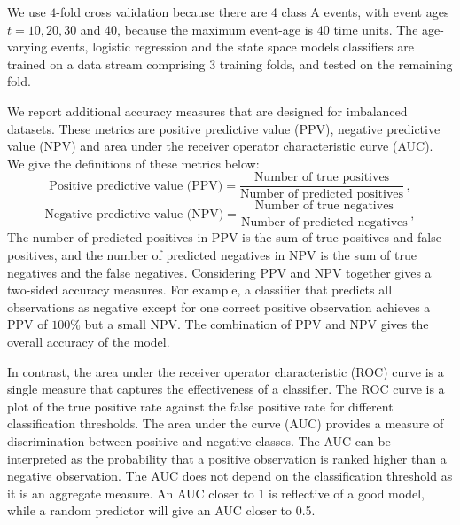 \documentclass[a4paper,11pt]{article}
\begin{document}
We use $4$-fold cross validation because there are 4 class A events, with event ages $t = 10, 20, 30$ and $40$, because the maximum event-age is $40$ time units. The age-varying events, logistic regression and the state space models classifiers are trained on a data stream comprising 3 training folds, and tested on the remaining fold.

We report additional accuracy measures that are designed for imbalanced datasets. These metrics are positive predictive value (PPV), negative predictive value (NPV) and area under the receiver operator characteristic curve (AUC). We give the definitions of these metrics below:
$$
  \text{Positive predictive value (PPV)} = \frac{ \text{Number of true positives} }{ \text{Number of predicted positives} } \, ,
$$
$$
  \text{Negative predictive value (NPV)} = \frac{ \text{Number of true negatives} }{ \text{Number of predicted negatives} } \, ,
$$
The number of predicted positives in PPV is the sum of true positives and false positives, and the number of predicted negatives in NPV is the sum of true negatives and the false negatives. Considering PPV and NPV together gives a two-sided accuracy measures. For example, a classifier that predicts all observations as negative except for one correct positive observation achieves a PPV of $100\%$ but a small NPV\@. The combination of PPV and NPV gives the overall accuracy of the model.

In contrast, the area under the receiver operator characteristic (ROC) curve is a single measure that captures the effectiveness of a classifier. The ROC curve is a plot of the true positive rate against the false positive rate for different classification thresholds. The area under the curve (AUC) provides a measure of discrimination between positive and negative classes. The AUC can be interpreted as the probability that a positive observation is ranked higher than a negative observation. The AUC does not depend on the classification threshold as it is an aggregate measure. An AUC closer to 1 is reflective of a good model, while a random predictor will give an AUC closer to 0.5.




\end{document}
